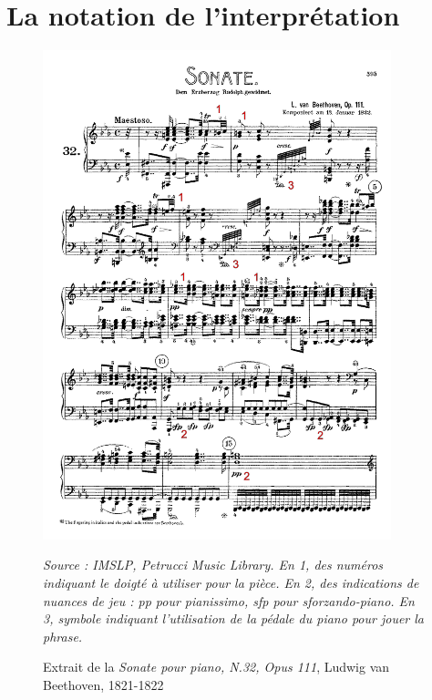 \section{La notation de l'interprétation}
\label{sec:exempleNotationInterpretation}
\begin{figure}[H]
	\centering
	\includegraphics[keepaspectratio=true, width=0.9\textwidth]{Annexes/i/exempleNotationInterpretation.png}
	\caption{Extrait de la \textit{Sonate pour piano, N.32, Opus 111}, Ludwig van Beethoven, 1821-1822}
	\label{fig:exempleNotationInterpretation}	
	\medskip
	\small
	\it
	Source : IMSLP, Petrucci Music Library. En 1, des numéros indiquant le doigté à utiliser pour la pièce.
	En 2, des indications de nuances de jeu : pp pour pianissimo, sfp pour sforzando-piano. En 3, symbole indiquant l'utilisation de la pédale du piano pour jouer la phrase. 	
\end{figure}

